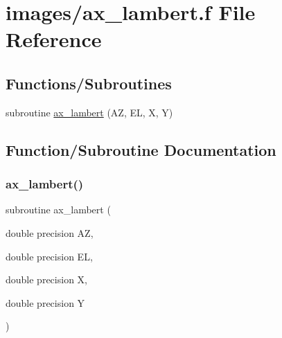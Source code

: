 \hypertarget{ax__lambert_8f}{}\section{images/ax\+\_\+lambert.f File Reference}
\label{ax__lambert_8f}
\subsection*{Functions/\+Subroutines}
\begin{DoxyCompactItemize}
\item 
subroutine \hyperlink{ax__lambert_8f_ac2cb34216ae115a90ffb8c74e615546c}{ax\+\_\+lambert} (AZ, EL, X, Y)
\end{DoxyCompactItemize}


\subsection{Function/\+Subroutine Documentation}
\mbox{\label{ax__lambert_8f_ac2cb34216ae115a90ffb8c74e615546c}} 
\subsubsection{\texorpdfstring{ax\+\_\+lambert()}{ax\_lambert()}}
{\footnotesize\ttfamily subroutine ax\+\_\+lambert (\begin{DoxyParamCaption}\item[{double precision}]{AZ,  }\item[{double precision}]{EL,  }\item[{double precision}]{X,  }\item[{double precision}]{Y }\end{DoxyParamCaption})}

